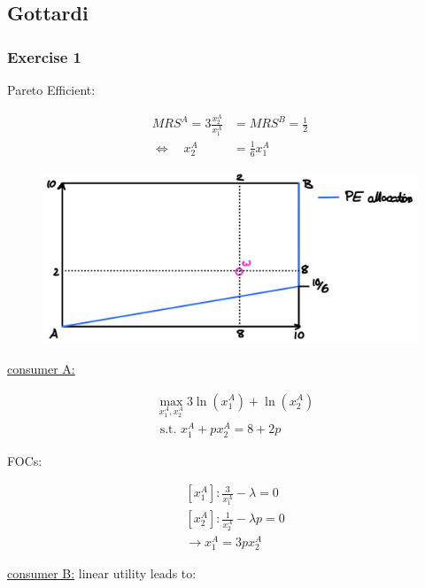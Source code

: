 \newpage
{
\subsection*{Gottardi}

{
\subsubsection*{Exercise 1}

\begin{enumerate}[label=(\roman*)]
{\item 
Pareto Efficient:

\begin{align*}
    M R S^{A}=3 \frac{x_{2}^{A}}{x_{1}^{A}}&=M R S^{B}=\frac{1}{2} \\
    \Longleftrightarrow \quad x_{2}^{A}&=\frac{1}{6} x_{1}^{A}
\end{align*}

\begin{figure}[!htp]
    \centering
    \includegraphics[width=.75\textwidth]{images/2021_22_1.png}
\end{figure}
}
{
\item 
\underline{consumer A:}

$$
\begin{aligned}
& \max _{x_{1}^{A}, x_{2}^{A}} 3 \ln \left(x_{1}^{A}\right)+\ln \left(x_{2}^{A}\right) \\
& \text { s.t. } x_{1}^{A}+p x_{2}^{A}=8+2 p 
\end{aligned}
$$

FOCs:

$$
\begin{aligned}
& \left[x_{1}^{A}\right]: \frac{3}{x_{1}^{A}}-\lambda=0 \\
& \left[x_{2}^{A}\right]: \frac{1}{x_{2}^{A}}-\lambda p=0 \\
& \rightarrow x_{1}^{A}=3 p x_{2}^{A}
\end{aligned}
$$

\underline{consumer B:} linear utility leads to:

}
\end{enumerate}}}
